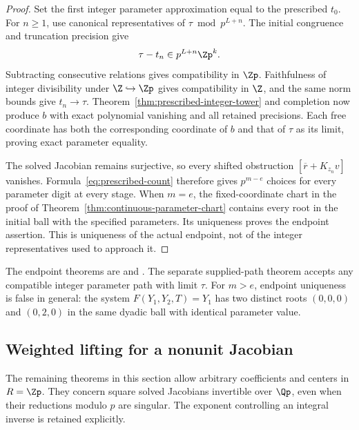 \begin{proof}
Set the first integer parameter approximation equal to the prescribed
$t_0$. For $n\ge1$, use canonical representatives of
$\tau\bmod p^{L+n}$. The initial congruence and truncation precision give
\[
 \tau-t_n\in p^{L+n}\Zp^k.
\]
Subtracting consecutive relations gives compatibility in $\Zp$.
Faithfulness of integer divisibility under $\Z\hookrightarrow\Zp$
gives compatibility in $\Z$, and the same norm bounds give $t_n\to\tau$.
Theorem~\ref{thm:prescribed-integer-tower} and completion now produce $b$
with exact polynomial vanishing and all retained precisions. Each free
coordinate has both the corresponding coordinate of $b$ and that of
$\tau$ as its limit, proving exact parameter equality.

The solved Jacobian remains surjective, so every shifted obstruction
$[\overline r+K_{z_n}v]$ vanishes. Formula~\eqref{eq:prescribed-count}
therefore gives $p^{m-e}$ choices for every parameter digit at every stage.
When $m=e$, the fixed-coordinate chart in the proof of
Theorem~\ref{thm:continuous-parameter-chart} contains every root in the
initial ball with the specified parameters. Its uniqueness proves the
endpoint assertion. This is uniqueness of the actual endpoint, not of the
integer representatives used to approach it.
\end{proof}

The endpoint theorems are
and .
The separate supplied-path theorem
accepts any compatible integer parameter path with limit $\tau$.
For $m>e$, endpoint uniqueness is false in general: the system
$F(Y_1,Y_2,T)=Y_1$ has two distinct roots $(0,0,0)$ and $(0,2,0)$ in the
same dyadic ball with identical parameter value.

\subsection{Weighted lifting for a nonunit Jacobian}

The remaining theorems in this section allow arbitrary coefficients and
centers in $R=\Zp$. They concern square solved Jacobians invertible over
$\Qp$, even when their reductions modulo $p$ are singular. The exponent
controlling an integral inverse is retained explicitly.

